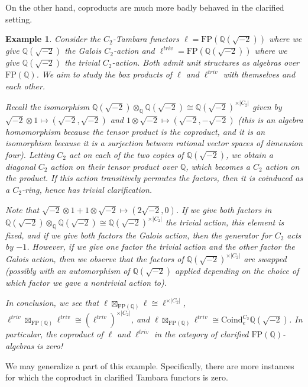 \documentclass[11pt,dvipsnames]{amsart}
\newcommand{\Q}{\mathbb{Q}}
\theoremstyle{BoldRemark}
\newtheorem{example}[theorem]{Example}
\begin{document}
On the other hand, coproducts are much more badly behaved in the clarified setting.

\begin{example}\label{ex:clarification-study-for-deg-two-ext-of-Q}
	Consider the $C_2$-Tambara functors $\ell = \mathrm{FP}(\Q(\sqrt{-2}))$ where we give $\Q(\sqrt{-2})$ the Galois $C_2$-action and $\ell^{triv} = \mathrm{FP}(\Q(\sqrt{-2}))$ where we give $\Q(\sqrt{-2})$ the trivial $C_2$-action. Both admit unit structures as algebras over $\mathrm{FP}(\Q)$. We aim to study the box products of $\ell$ and $\ell^{triv}$ with themselves and each other.
	
	Recall the isomorphism $\Q(\sqrt{-2}) \otimes_{\Q} \Q(\sqrt{-2}) \cong \Q(\sqrt{-2})^{\times |C_2|}$ given by $\sqrt{-2} \otimes 1 \mapsto (\sqrt{-2},\sqrt{-2})$ and $1 \otimes \sqrt{-2} \mapsto (\sqrt{-2},-\sqrt{-2})$ (this is an algebra homomorphism because the tensor product is the coproduct, and it is an isomorphism because it is a surjection between rational vector spaces of dimension four). Letting $C_2$ act on each of the two copies of $\Q(\sqrt{-2})$, we obtain a diagonal $C_2$ action on their tensor product over $\Q$, which becomes a $C_2$ action on the product. If this action transitively permutes the factors, then it is coinduced as a $C_2$-ring, hence has trivial clarification.
	
	Note that $\sqrt{-2} \otimes 1 + 1 \otimes \sqrt{-2} \mapsto (2 \sqrt{-2},0)$. If we give both factors in $\Q(\sqrt{-2}) \otimes_{\Q} \Q(\sqrt{-2}) \cong \Q(\sqrt{-2})^{\times |C_2|}$ the trivial action, this element is fixed, and if we give both factors the Galois action, then the generator for $C_2$ acts by $-1$. However, if we give one factor the trivial action and the other factor the Galois action, then we observe that the factors of $\Q(\sqrt{-2})^{\times |C_2|}$ are swapped (possibly with an automorphism of $\Q(\sqrt{-2})$ applied depending on the choice of which factor we gave a nontrivial action to).
	
	In conclusion, we see that $\ell \boxtimes_{\mathrm{FP}(\Q)} \ell \cong \ell^{\times |C_2|}$, $\ell^{triv} \boxtimes_{\mathrm{FP}(\Q)} \ell^{triv} \cong \left( \ell^{triv} \right)^{\times |C_2|}$, and $\ell \boxtimes_{\mathrm{FP}(\Q)} \ell^{triv} \cong \mathrm{Coind}_e^{C_2} \Q(\sqrt{-2})$. In particular, the coproduct of $\ell$ and $\ell^{triv}$ in the category of clarified $\mathrm{FP}(\Q)$-algebras is zero!
\end{example}

We may generalize a part of this example. Specifically, there are more instances for which the coproduct in clarified Tambara functors is zero.
\end{document}
